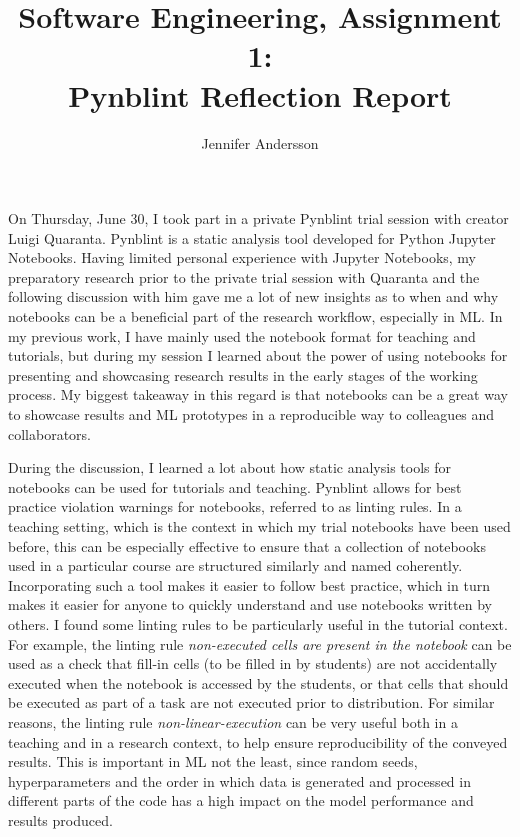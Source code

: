 \documentclass{article}
\title{Software Engineering, Assignment 1: \\ Pynblint Reflection Report}
\author{Jennifer Andersson}
\begin{document}
\maketitle

On Thursday, June 30, I took part in a private Pynblint trial session with creator Luigi Quaranta. Pynblint is a static analysis tool developed for Python Jupyter Notebooks. Having limited personal experience with Jupyter Notebooks, my preparatory research prior to the private trial session with Quaranta and the following discussion with him gave me a lot of new insights as to when and why notebooks can be a beneficial part of the research workflow, especially in ML. In my previous work, I have mainly used the notebook format for teaching and tutorials, but during my session I learned about the power of using notebooks for presenting and showcasing research results in the early stages of the working process. My biggest takeaway in this regard is that notebooks can be a great way to showcase results and ML prototypes in a reproducible way to colleagues and collaborators. 

During the discussion, I learned a lot about how static analysis tools for notebooks can be used for tutorials and teaching. Pynblint allows for best practice violation warnings for notebooks, referred to as linting rules. In a teaching setting, which is the context in which my trial notebooks have been used before, this can be especially effective to ensure that a collection of notebooks used in a particular course are structured similarly and named coherently. Incorporating such a tool makes it easier to follow best practice, which in turn makes it easier for anyone to quickly understand and use notebooks written by others. I found some linting rules to be particularly useful in the tutorial context. For example, the linting rule \emph{non-executed cells are present in the notebook} can be used as a check that fill-in cells (to be filled in by students) are not accidentally executed when the notebook is accessed by the students, or that cells that should be executed as part of a task are not executed prior to distribution. For similar reasons, the linting rule \emph{non-linear-execution} can be very useful both in a teaching and in a research context, to help ensure reproducibility of the conveyed results. This is important in ML not the least, since random seeds, hyperparameters and the order in which data is generated and processed in different parts of the code has a high impact on the model performance and results produced.
\end{document}
